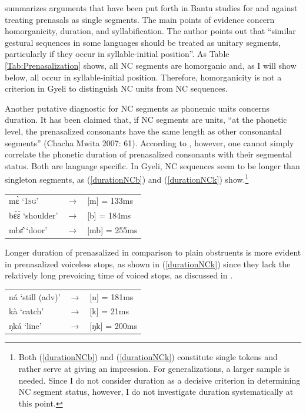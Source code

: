 \citet{chacha2007} summarizes arguments that have been put forth in Bantu studies for and against treating prenasals as single segments. The main points of evidence concern homorganicity, duration, and syllabification. The author points out that ``similar gestural sequences in some languages should be treated as unitary segments, particularly if they occur in syllable-initial position''. As Table \ref{Tab:Prenasalization} shows, all NC segments are homorganic and, as I will show below, all occur in syllable-initial position. Therefore, homorganicity is not a criterion in Gyeli to distinguish NC units from NC sequences.  

Another putative diagnostic for NC segments as phonemic units concerns duration. It has been claimed that, if NC segments are units, 
 ``at the phonetic level, the prenasalized consonants have the same length as other consonantal segments'' (Chacha Mwita 2007: 61). According to \citet[183]{downing2005}, however, one cannot simply correlate the phonetic duration of prenasalized consonants with their segmental status. Both are language specific. In Gyeli, NC sequences seem to be longer than singleton segments, as (\ref{durationNCb}) and (\ref{durationNCk}) show.\footnote{Both (\ref{durationNCb}) and (\ref{durationNCk}) constitute single tokens and rather serve at giving an impression. For generalizations, a larger sample is needed. Since I do not consider duration as a decisive criterion in determining NC segment status, however, I do not investigate duration systematically at this point.}

\begin{exe} \ex \label{durationNCb}
\begin{tabular}{lll}
mɛ̀ `1\textsc{sg}' & $\rightarrow$ & [m] = 133ms\\
bɛ́ɛ̀ `shoulder' & $\rightarrow$ & [b] = 184ms \\
mbɛ̂ `door' &  $\rightarrow$ & [mb] = 255ms\\
\end{tabular}
\end{exe}

\noindent Longer duration of prenasalized in comparison to plain obstruents is more evident in prenasalized voiceless stops, as shown in (\ref{durationNCk}) since they lack the relatively long prevoicing time of voiced stops, as discussed in .

\begin{exe} \ex \label{durationNCk}
\begin{tabular}{lll}
ná `still (adv)' & $\rightarrow$ & [n] = 181ms\\
kà `catch' & $\rightarrow$ & [k] = 21ms \\
ŋká `line' &  $\rightarrow$ & [ŋk] = 200ms\\
\end{tabular}
\end{exe}

